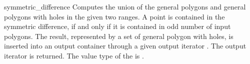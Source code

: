 \begin{ccRefFunction}{symmetric_difference}
{Computes the union of the general polygons and general polygons
with holes in the given two ranges. A point is contained in the 
symmetric difference, if and only if it is contained in odd number of 
input polygons. The result, represented by a set of general polygon with 
holes, is inserted into an output container through a given output 
iterator . The output iterator is returned. The value type of 
the  is .}

\ccSeeAlso
{}\\
\\
\\

\end{ccRefFunction}

\ccRefPageEnd
